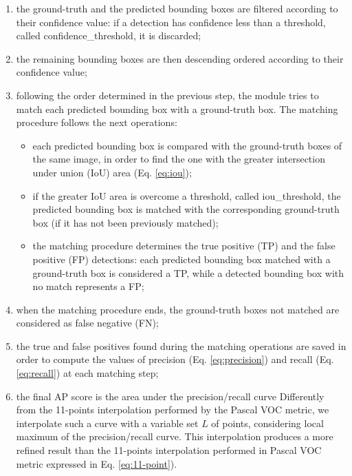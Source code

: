 \begin{enumerate}
	\item the ground-truth and the predicted bounding boxes are filtered according to their confidence value: if a detection has confidence less than a threshold, called \textsf{confidence\_threshold}, it is discarded;
	\item the remaining bounding boxes are then descending ordered according to their confidence value;
	\item  following the order determined in the previous step, the module tries to match each predicted bounding box with a  ground-truth box. The matching procedure follows the next operations:
	\begin{itemize}
		\item each predicted bounding box is compared with the  ground-truth boxes of the same image, in order to find the one with the greater intersection under union (IoU) area (Eq. \ref{eq:iou});
		\item if the greater IoU area is overcome a threshold, called \textsf{iou\_threshold}, the predicted bounding box is matched with the corresponding  ground-truth box (if it has not been previously matched);
		\item the matching procedure determines the true positive (TP) and the false positive (FP) detections: each predicted bounding box matched with a  ground-truth box is considered a TP, while a detected bounding box with no match represents a FP;
	\end{itemize}
	\item when the matching procedure ends, the  ground-truth boxes not matched  are considered as false negative (FN);
	\item the true and false positives found during the matching operations are saved in order to compute the values of precision (Eq. \ref{eq:precision}) and recall (Eq. \ref{eq:recall}) at each matching step; 
	\item the final AP score is the area under the precision/recall curve Differently from the 11-points interpolation performed by the Pascal VOC metric, we interpolate such a curve with a variable set $L$ of points, considering local maximum of the precision/recall curve. This interpolation produces a more refined result than the 11-points interpolation performed in Pascal VOC metric expressed in Eq. \ref{eq:11-point}).
\end{enumerate} 

